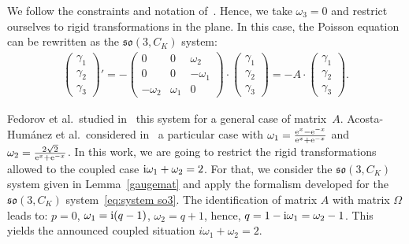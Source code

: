 \documentclass[10pt,a4paper]{amsart}
\numberwithin{equation}{section}
\begin{document}
We follow the constraints and notation of~\cite{femapr}. Hence, we take $\omega_3 =0$ and restrict ourselves to rigid transformations in the plane. In this case, the Poisson equation can be rewritten as the $\mathfrak{so}(3, C_K)$ system:
\begin{gather*}%
 \begin{pmatrix} \gamma_1 \\ \gamma_2 \\ \gamma_3 \end{pmatrix}' = - \begin{pmatrix}
0 & 0 & \omega_2 \\ 0 & 0 & - \omega_1 \\ -\omega_2 & \omega_1 & 0 \end{pmatrix} \cdot \begin{pmatrix} \gamma_1 \\ \gamma_2 \\ \gamma_3 \end{pmatrix} = - A \cdot \begin{pmatrix} \gamma_1 \\ \gamma_2 \\ \gamma_3 \end{pmatrix}\!.
\end{gather*}

Fedorov et al.\ studied in~\cite{femapr} this system for a general case of matrix~$A$. Acosta-Hum\'anez et al.\ considered in~\cite{acjios} a particular case with $\omega_1 = \frac{{\rm e}^x - {\rm e}^{-x}}{{\rm e}^x + {\rm e}^{-x}}$ and $\omega_2 = \frac{2 \sqrt{2}}{{\rm e}^x + {\rm e}^{-x}}$. In this work, we are going to restrict the rigid transformations allowed to the coupled case ${\rm i}\omega_1 + \omega_2 = 2$.
For that, we consider the $\mathfrak{so}(3, C_K)$ system given in Lemma~\ref{gaugemat} and apply the formalism developed for the $\mathfrak{so}(3, C_K)$ system~\eqref{eq:system so3}.
The identification of matrix $A$ with matrix $\Omega$ leads to: $p=0$, $\omega_1 = {\rm i}(q-1)$, $\omega_2 = q+1$, hence, $q = 1- {\rm i}\omega_1 = \omega_2 -1$. This yields the announced coupled situation $i\omega_1 + \omega_2 = 2$.
\end{document}
